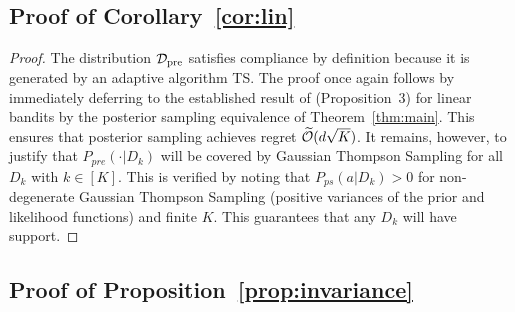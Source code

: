\subsection{Proof of Corollary~\ref{cor:lin}}

\corlin*

\begin{proof}
    The distribution $\mathcal{D}_{\text{pre}}$ satisfies compliance by definition because it is generated by an adaptive algorithm TS.
    The proof once again follows by immediately deferring  to the established result of \cite{russo2014learning} (Proposition~3) for linear bandits by the posterior sampling equivalence of Theorem~\ref{thm:main}. This ensures that posterior sampling achieves regret $\widetilde{\mathcal{O}}(d\sqrt{K})$. It remains, however, to justify that $P_{pre}(\cdot | D_k)$ will be covered by Gaussian Thompson Sampling for all $D_k$ with $k \in [K]$. This is verified by noting that $P_{ps}(a | D_k) > 0$ for non-degenerate Gaussian Thompson Sampling (positive variances of the prior and likelihood functions) and finite $K$. This guarantees that any $D_k$ will have support.
\end{proof}



\subsection{Proof of Proposition~\ref{prop:invariance}}

\propinvariance*

